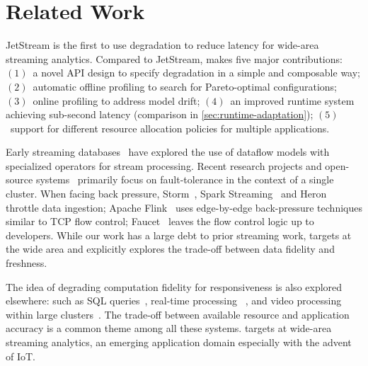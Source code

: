 \section{Related Work}
\label{sec:related-work}

 JetStream is the first to use degradation to reduce latency
for wide-area streaming analytics. Compared to JetStream, \sysname{} makes five
major contributions: $(1)$~a novel API design to specify degradation in a simple
and composable way; $(2)$~automatic offline profiling to search for
Pareto-optimal configurations; $(3)$~online profiling to address model drift;
$(4)$~an improved runtime system achieving sub-second latency (comparison in
\autoref{sec:runtime-adaptation}); $(5)$~support for different resource
allocation policies for multiple applications.

 Early streaming
databases~\cite{abadi2005design, chandrasekaran2003telegraphcq} have explored
the use of dataflow models with specialized operators for stream
processing. Recent research projects and open-source
systems~\cite{akidau2013millwheel, toshniwal2014storm, sanjeev2015twitter,
  zaharia2013discretized, carbone2015apache} primarily focus on fault-tolerance
in the context of a single cluster. When facing back pressure,
Storm~\cite{toshniwal2014storm}, Spark Streaming~\cite{zaharia2013discretized}
and Heron~\cite{sanjeev2015twitter} throttle data ingestion; Apache
Flink~\cite{carbone2015apache} uses edge-by-edge back-pressure techniques
similar to TCP flow control; Faucet~\cite{lattuada2016faucet} leaves the flow
control logic up to developers.  While our work has a large debt to prior
streaming work, \sysname{} targets at the wide area and explicitly explores the
trade-off between data fidelity and freshness.

 The idea of degrading computation fidelity for
responsiveness is also explored elsewhere: such as SQL
queries~\cite{hellerstein1997online, agarwal2013blinkdb,
  ananthanarayanan2014grass}, real-time processing~\cite{farrell2016meantime} ,
and video processing within large clusters~\cite{zhang2017live}. The trade-off
between available resource and application accuracy is a common theme among all
these systems. \sysname{} targets at wide-area streaming analytics, an emerging
application domain especially with the advent of IoT\@.

